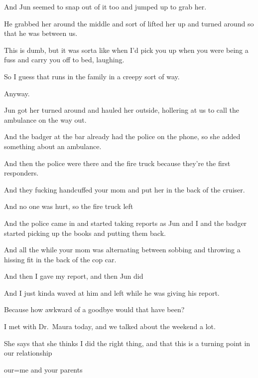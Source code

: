 { And Jun seemed to snap out of it too and jumped up to grab her.

 He grabbed her around the middle and sort of lifted her up and turned around so that he was between us.

 This is dumb, but it was sorta like when I'd pick you up when you were being a fuss and carry you off to bed, laughing.

 So I guess that runs in the family in a creepy sort of way.

 Anyway.

 Jun got her turned around and hauled her outside, hollering at us to call the ambulance on the way out.

 And the badger at the bar already had the police on the phone, so she added something about an ambulance.

 And then the police were there and the fire truck because they're the first responders.

 And they fucking handcuffed your mom and put her in the back of the cruiser.

 And no one was hurt, so the fire truck left

 And the police came in and started taking reports as Jun and I and the badger started picking up the books and putting them back.

 And all the while your mom was alternating between sobbing and throwing a hissing fit in the back of the cop car.

 And then I gave my report, and then Jun did

 And I just kinda waved at him and left while he was giving his report.

 Because how awkward of a goodbye would that have been?

 I met with Dr.~Maura today, and we talked about the weekend a lot.

 She says that she thinks I did the right thing, and that this is a turning point in our relationship

 our=me and your parents

}
